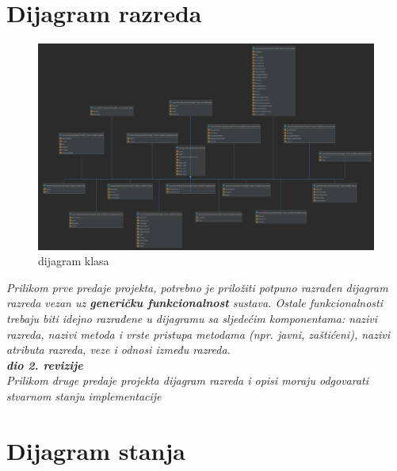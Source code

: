 		\section{Dijagram razreda}
			\begin{figure}[H]
				\centering
				\includegraphics[scale=0.08]{dijagrami/dijagram-klasa.png}
				\caption{dijagram klasa}
				\label{fig:klase}
			\end{figure}
			
			
			\textit{Prilikom prve predaje projekta, potrebno je priložiti potpuno razrađen dijagram razreda vezan uz \textbf{generičku funkcionalnost} sustava. Ostale funkcionalnosti trebaju biti idejno razrađene u dijagramu sa sljedećim komponentama: nazivi razreda, nazivi metoda i vrste pristupa metodama (npr. javni, zaštićeni), nazivi atributa razreda, veze i odnosi između razreda.}\\
			
			\textbf{\textit{dio 2. revizije}}\\			
			
			\textit{Prilikom druge predaje projekta dijagram razreda i opisi moraju odgovarati stvarnom stanju implementacije}
			
			
			
			\eject
		
		\section{Dijagram stanja}
			
